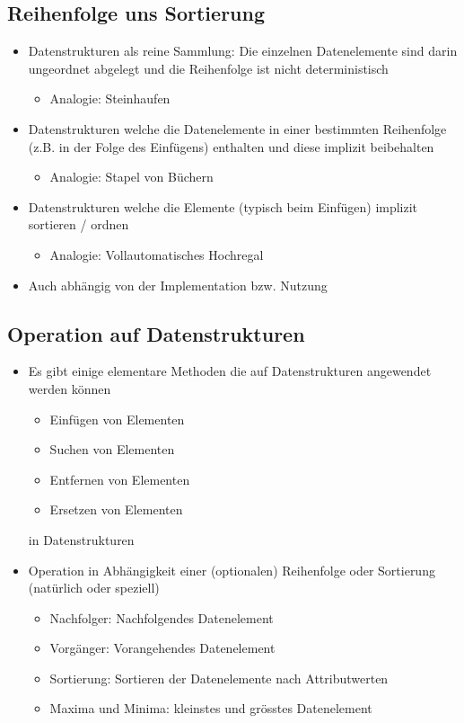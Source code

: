 \subsection{Reihenfolge uns Sortierung}
\begin{itemize}
    \item Datenstrukturen als reine Sammlung: Die einzelnen Datenelemente sind darin ungeordnet abgelegt und die Reihenfolge ist nicht deterministisch
    \begin{itemize}
        \item Analogie: Steinhaufen
    \end{itemize}
    \item Datenstrukturen welche die Datenelemente in einer bestimmten Reihenfolge (z.B. in der Folge des Einfügens) enthalten und diese implizit beibehalten
    \begin{itemize}
        \item Analogie: Stapel von Büchern
    \end{itemize}
    \item Datenstrukturen welche die Elemente (typisch beim Einfügen) implizit sortieren / ordnen
    \begin{itemize}
        \item Analogie: Vollautomatisches Hochregal
    \end{itemize}
    \item Auch abhängig von der Implementation bzw. Nutzung
\end{itemize}

\subsection{Operation auf Datenstrukturen}
\begin{itemize}
    \item Es gibt einige elementare Methoden die auf Datenstrukturen angewendet werden können
    \begin{itemize}
        \item Einfügen von Elementen
        \item Suchen von Elementen
        \item Entfernen von Elementen
        \item Ersetzen von Elementen
    \end{itemize}
in Datenstrukturen
    \item Operation in Abhängigkeit einer (optionalen) Reihenfolge oder Sortierung (natürlich oder speziell)
    \begin{itemize}
        \item Nachfolger: Nachfolgendes Datenelement
        \item Vorgänger: Vorangehendes Datenelement
        \item Sortierung: Sortieren der Datenelemente nach Attributwerten
        \item Maxima und Minima: kleinstes und grösstes Datenelement
    \end{itemize}
\end{itemize}

